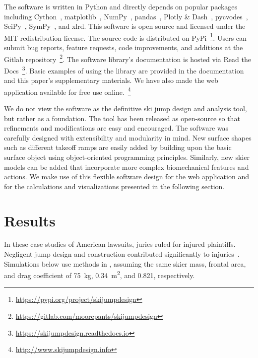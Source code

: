 \documentclass{article}
\begin{document}
The software is written in Python and directly depends on popular packages
including Cython~\cite{Behnel2011}, matplotlib~\cite{Hunter2007},
NumPy~\cite{Oliphant2006}, pandas~\cite{McKinney2020}, Plotly \&
Dash~\cite{Plotly2015}, pycvodes~\cite{Dahlgren2018},
SciPy~\cite{Virtanen2020}, SymPy~\cite{Meurer2017}, and xlrd. This software is
open source and licensed under the MIT redistribution license. The source code
is distributed on PyPi~\footnote{\url{https://pypi.org/project/skijumpdesign}}.
Users can submit bug reports, feature requests, code improvements, and
additions at the Gitlab
repository~\footnote{\url{https://gitlab.com/moorepants/skijumpdesign}}. The
software library's documentation is hosted via Read the
Docs~\footnote{\url{https://skijumpdesign.readthedocs.io}}.  Basic examples of
using the library are provided in the documentation and this paper's
supplementary materials. We have also made the web application available for
free use online.~\footnote{ \url{http://www.skijumpdesign.info}}

We do not view the software as the definitive ski jump design and analysis
tool, but rather as a foundation. The tool has been released as open-source so
that refinements and modifications are easy and encouraged. The software was
carefully designed with extensibility and modularity in mind. New surface
shapes such as different takeoff ramps are easily added by building upon the
basic surface object using object-oriented programming principles. Similarly,
new skier models can be added that incorporate more complex biomechanical
features and actions. We make use of this flexible software design for the web
application and for the calculations and visualizations presented in the
following section.

\section{Results}
\label{sec:case}
%
In these case studies of American lawsuits, juries ruled for injured
plaintiffs. Negligent jump design and construction contributed significantly to
injuries~\cite{SuperiorCourtSanFranciscoCounty2002,KingCountySuperiorCourt2008}.
Simulations below use methods in \cite{Levy2015}, assuming the same skier mass,
frontal area, and drag coefficient of 75~\si{\kg}, 0.34~\si{\meter\squared},
and 0.821, respectively.
\end{document}
